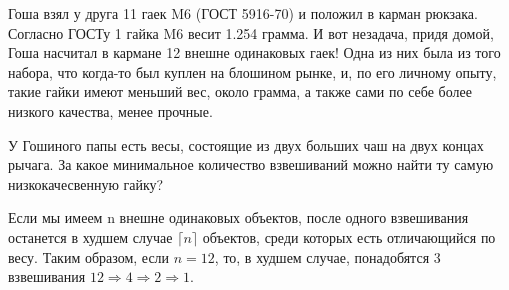 
Гоша взял у друга 11 гаек M6 (ГОСТ 5916-70) и положил в карман рюкзака. 
Согласно ГОСТу 1  гайка M6 весит 1.254 грамма. 
И вот незадача, придя домой, Гоша насчитал в кармане 12  внешне одинаковых гаек! 
Одна из них была из того набора, что когда-то был куплен на блошином рынке, и, по его личному опыту, 
такие гайки имеют меньший вес, около грамма, а также сами по себе более низкого качества, 
менее прочные. 

У Гошиного папы есть весы, состоящие из двух больших чаш на двух концах рычага. За какое минимальное количество взвешиваний можно найти ту самую низкокачесвенную гайку?

\soultionSection

Если мы имеем n внешне одинаковых объектов, после одного взвешивания останется в худшем случае $\lceil n \rceil$ объектов, среди которых есть отличающийся по весу. Таким образом, если $n = 12$, то, в худшем случае, понадобятся 3 взвешивания $12\Rightarrow 4\Rightarrow 2\Rightarrow 1$.

